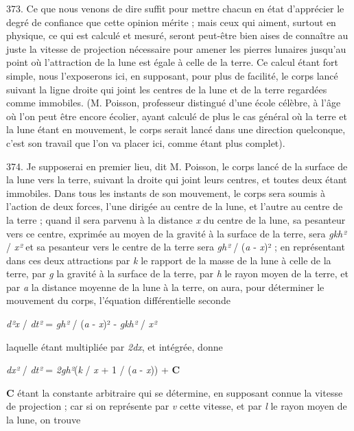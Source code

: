 \documentclass[a4paper, 11pt, oneside, polutonikogreek, french]{article}
\begin{document}
373. Ce que nous venons de dire suffit pour mettre chacun en état d'apprécier le degré de confiance que cette opinion mérite ; mais ceux qui aiment, surtout en physique, ce qui est calculé et mesuré, seront peut-être bien aises de connaître au juste la vitesse de projection nécessaire pour amener les pierres lunaires jusqu'au point où l'attraction de la lune est égale à celle de la terre. Ce calcul étant fort simple, nous l'exposerons ici, en supposant, pour plus de facilité, le corps lancé suivant la ligne droite qui joint les centres de la lune et de la terre regardées comme immobiles. (M. Poisson, professeur distingué d'une école célèbre, à l'âge où l'on peut être encore écolier, ayant calculé de plus le cas général où la terre et la lune étant en mouvement, le corps serait lancé dans une direction quelconque, c'est son travail que l'on va placer ici, comme étant plus complet).

374. \og Je supposerai en premier lieu, dit M. Poisson, le corps lancé de la surface de la lune vers la terre, suivant la droite qui joint leurs centres, et toutes deux étant immobiles. Dans tous les instants de son mouvement, le corps sera soumis à l'action de deux forces, l'une dirigée au centre de la lune, et l'autre au centre de la terre ; quand il sera parvenu à la distance \emph{x} du centre de la lune, sa pesanteur vers ce centre, exprimée au moyen de la gravité à la surface de la terre, sera \emph{gkh²} / \emph{x²} et sa pesanteur vers le centre de la terre sera \emph{gh²} / (\emph{a} - \emph{x})² ; en représentant dans ces deux attractions par \emph{k} le rapport de la masse de la lune à celle de la terre, par \emph{g} la gravité à la surface de la terre, par \emph{h} le rayon moyen de la terre, et par \emph{a} la distance moyenne de la lune à la terre, on aura, pour déterminer le mouvement du corps, l'équation différentielle seconde

\begin{center}
\emph{d²x} / \emph{dt²} = \emph{gh²} / (\emph{a} - \emph{x})² - \emph{gkh²} / \emph{x²}
\end{center}

laquelle étant multipliée par \emph{2dx}, et intégrée, donne

\begin{center}
\emph{dx²} / \emph{dt²} = \emph{2gh²}(\emph{k} / \emph{x} + 1 / (\emph{a} - \emph{x})) + \textbf{C}
\end{center}

\textbf{C} étant la constante arbitraire qui se détermine, en supposant connue la vitesse de projection ; car si on représente par \emph{v} cette vitesse, et par \emph{l} le rayon moyen de la lune, on trouve
\end{document}
